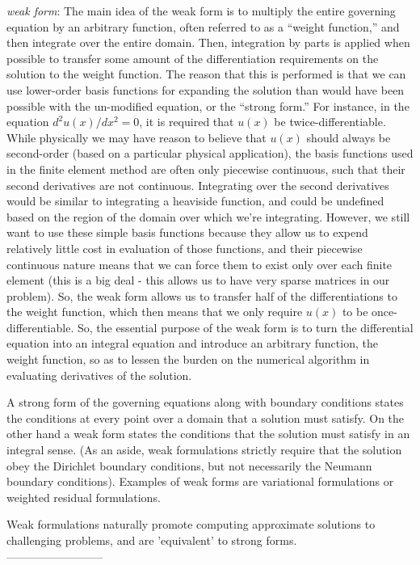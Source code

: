 \documentclass[12pt]{article}
\begin{document}
\emph{weak form}: The main idea of the weak form is to multiply the entire governing equation by an arbitrary function, often referred to as a ``weight function,'' and then integrate over the entire domain. Then, integration by parts is applied when possible to transfer some amount of the differentiation requirements on the solution to the weight function. The reason that this is performed is that we can use lower-order basis functions for expanding the solution than would have been possible with the un-modified equation, or the ``strong form.'' For instance, in the equation \(d^2u(x)/dx^2=0\), it is required that \(u(x)\) be twice-differentiable. While physically we may have reason to believe that \(u(x)\) should always be second-order (based on a particular physical application), the basis functions used in the finite element method are often only piecewise continuous, such that their second derivatives are not continuous. Integrating over the second derivatives would be similar to integrating a heaviside function, and could be undefined based on the region of the domain over which we're integrating. However, we still want to use these simple basis functions because they allow us to expend relatively little cost in evaluation of those functions, and their piecewise continuous nature means that we can force them to exist only over each finite element (this is a big deal - this allows us to have very sparse matrices in our problem). So, the weak form allows us to transfer half of the differentiations to the weight function, which then means that we only require \(u(x)\) to be once-differentiable. So, the essential purpose of the weak form is to turn the differential equation into an integral equation and introduce an arbitrary function, the weight function, so as to lessen the burden on the numerical algorithm in evaluating derivatives of the solution.

A strong form of the governing equations along with boundary conditions states the conditions at every point over a domain that a solution must satisfy. On the other hand a weak form states the conditions that the solution must satisfy in an integral sense. (As an aside, weak formulations strictly require that the solution obey the Dirichlet boundary conditions, but not necessarily the Neumann boundary conditions). Examples of weak forms are variational formulations or weighted residual formulations. 

Weak  formulations  naturally  promote  computing  approximate  solutions  to  challenging problems, and are 'equivalent' to strong forms.
\\
--------------------------
\end{document}
